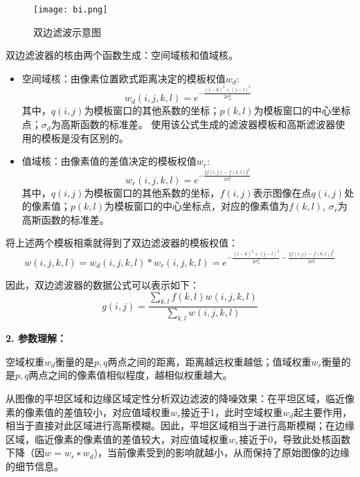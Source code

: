 \documentclass[lang=cn,10pt]{elegantbook}
\begin{document}
\begin{figure}
  \centering
  \texttt{[image: bi.png]}
  \caption{双边滤波示意图}
  \label{fig:bi}
\end{figure}

双边滤波器的核由两个函数生成：空间域核和值域核。
\begin{itemize}

\item 空间域核：由像素位置欧式距离决定的模板权值$w_d$:
\begin{equation}\label{eu_eqn}
w_d(i,j,k,l)=e^{-\frac{(i-k)^2+(j-l)^2}{2\sigma_d^2}}
\end{equation}
其中，$q(i,j)$为模板窗口的其他系数的坐标；$p(k,l)$为模板窗口的中心坐标点；$\sigma_d$为高斯函数的标准差。 使用该公式生成的滤波器模板和高斯滤波器使用的模板是没有区别的。

 \item 值域核：由像素值的差值决定的模板权值$w_r$:
 \begin{equation}\label{eu_eqn}
w_r(i,j,k,l)=e^{-\frac{\Vert f(i,j)-f(k,l) \Vert^2}{2\sigma_r^2}}
\end{equation}
其中，$q(i,j)$为模板窗口的其他系数的坐标，$f(i,j)$表示图像在点$q(i,j)$处的像素值；$p(k,l)$为模板窗口的中心坐标点，对应的像素值为$f(k,l)$, $\sigma_r$为高斯函数的标准差。

\end{itemize}

将上述两个模板相乘就得到了双边滤波器的模板权值：
\begin{equation}\label{eu_eqn}
w(i,j,k,l)=w_d(i,j,k,l)*w_r(i,j,k,l)=e^{-\frac{(i-k)^2+(j-l)^2}{2\sigma_d^2}-\frac{\Vert f(i,j)-f(k,l) \Vert^2}{2\sigma_r^2}}
\end{equation}

因此，双边滤波器的数据公式可以表示如下：
\begin{equation}\label{eu_eqn}
g(i,j)=\frac{\sum_{k,l}f(k,l)w(i,j,k,l)}{\sum_{k,l}w(i,j,k,l)}
\end{equation}

\textcolor{third}{\textbf{2. 参数理解：}}

空域权重$w_d$衡量的是$p,q$两点之间的距离，距离越远权重越低；值域权重$w_r$衡量的是$p,q$两点之间的像素值相似程度，越相似权重越大。

从图像的平坦区域和边缘区域定性分析双边滤波的降噪效果：在平坦区域，临近像素的像素值的差值较小，对应值域权重$w_r$接近于1，此时空域权重$w_d$起主要作用，相当于直接对此区域进行高斯模糊。因此，平坦区域相当于进行高斯模糊；在边缘区域，临近像素的像素值的差值较大，对应值域权重$w_r$接近于0，导致此处核函数下降（因$w=w_r∗w_d$)，当前像素受到的影响就越小，从而保持了原始图像的边缘的细节信息。
\end{document}
